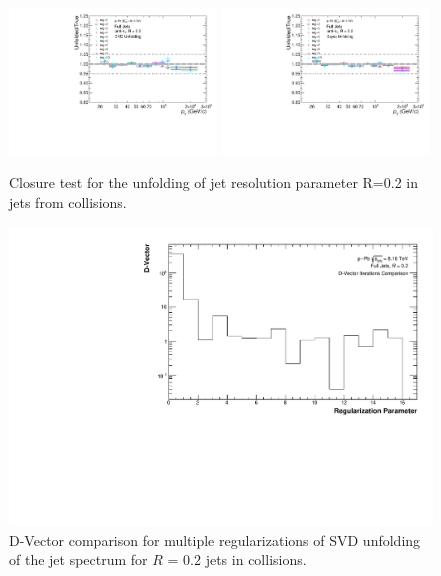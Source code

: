 \begin{figure}[hbt!]
    \centering
    \begin{multicols}{2}
            \includegraphics[width=0.49\textwidth]{figures/pPbFigures/UnfoldingComparisons/Closure/RatioClosure1DSvd_R02.pdf}
        \vfill\null
        \columnbreak
            \includegraphics[width=0.49\textwidth]{figures/pPbFigures/UnfoldingComparisons/Closure/RatioClosure1DBayes_R02.pdf}
        \vfill\null
    \end{multicols}
    \caption{Closure test for the unfolding of jet resolution parameter R=0.2 in jets from \pPb collisions.}
    \label{fig:ClosurepPb}
\end{figure}


\begin{figure}[hbt!]
    \centering
    \includegraphics[width=15cm]{figures/pPbFigures/DVector/DVector_R02.pdf}
    \caption{D-Vector comparison for multiple regularizations of SVD unfolding of the jet spectrum for $R$ = 0.2 jets in \pPb collisions.}
    \label{fig:DVectorpPb}
\end{figure}
